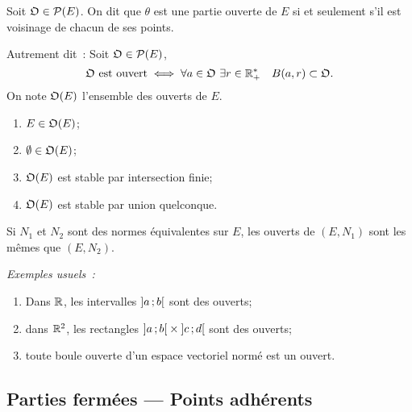 \begin{defdef}
  Soit \(\mathfrak{O} \in \mathcal{P}(E)\). On dit que \(\theta\) est une partie ouverte
  de \(E\) si et seulement s'il est voisinage de chacun de ses points.

  Autrement dit~: Soit \(\mathfrak{O} \in \mathcal{P}(E)\),
  \begin{equation}
    \mathfrak{O} \text{~est ouvert} \iff \forall a \in \mathfrak{O} \ \exists r \in
    \mathbb{R}_{+}^{*} \quad B(a, r) \subset \mathfrak{O}.
  \end{equation}
  On note \(\mathfrak{O}(E)\) l'ensemble des ouverts de \(E\).
\end{defdef}
\begin{prop}
  \begin{enumerate}
    \item \(E \in \mathfrak{O}(E)\);
    \item \(\emptyset \in \mathfrak{O}(E)\);
    \item \(\mathfrak{O}(E)\) est stable par intersection finie;
    \item \(\mathfrak{O}(E)\) est stable par union quelconque.
  \end{enumerate}
\end{prop}
%
\begin{prop}[Admise]
  Si \(N_1\) et \(N_2\) sont des normes équivalentes sur \(E\), les ouverts
  de \((E, N_1)\) sont les mêmes que \((E, N_2)\).
\end{prop}

\emph{Exemples usuels~:}
\begin{enumerate}
  \item Dans \(\mathbb{R}\), les intervalles \(\left] a \, ; {} b \right[\) sont des
    ouverts;
  \item dans \(\mathbb{R}^2\), les rectangles
    \(\left] a \, ; {} b \right[\times\left] c \, ; {} d \right[\) sont des ouverts;
  \item toute boule ouverte d'un espace vectoriel normé est un ouvert.
\end{enumerate}

\subsection{Parties fermées --- Points adhérents}

